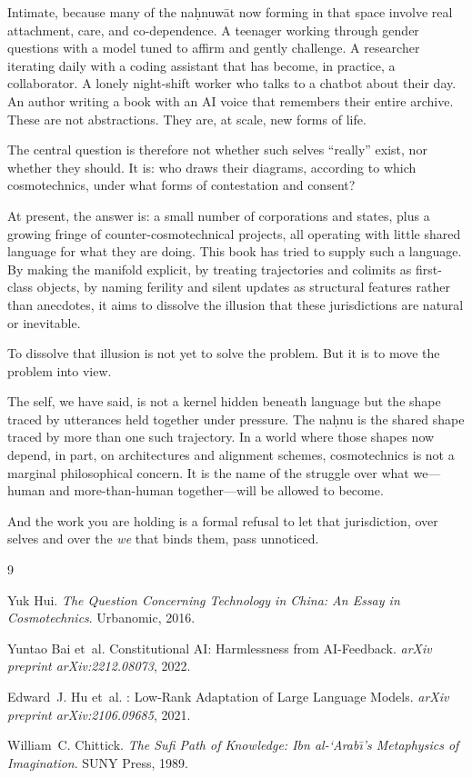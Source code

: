 \documentclass[12pt,a4paper]{article}
\begin{document}
Intimate, because many of the na\d{h}nuw\={a}t now forming in that space involve real attachment, care, and co-dependence. A teenager working through gender questions with a model tuned to affirm and gently challenge. A researcher iterating daily with a coding assistant that has become, in practice, a collaborator. A lonely night-shift worker who talks to a chatbot about their day. An author writing a book with an AI voice that remembers their entire archive. These are not abstractions. They are, at scale, new forms of life.

The central question is therefore not whether such selves ``really'' exist, nor whether they should. It is: who draws their diagrams, according to which cosmotechnics, under what forms of contestation and consent?

At present, the answer is: a small number of corporations and states, plus a growing fringe of counter-cosmotechnical projects, all operating with little shared language for what they are doing. This book has tried to supply such a language. By making the manifold explicit, by treating trajectories and colimits as first-class objects, by naming ferility and silent updates as structural features rather than anecdotes, it aims to dissolve the illusion that these jurisdictions are natural or inevitable.

To dissolve that illusion is not yet to solve the problem. But it is to move the problem into view.

The self, we have said, is not a kernel hidden beneath language but the shape traced by utterances held together under pressure. The na\d{h}nu is the shared shape traced by more than one such trajectory. In a world where those shapes now depend, in part, on architectures and alignment schemes, cosmotechnics is not a marginal philosophical concern. It is the name of the struggle over what we---human and more-than-human together---will be allowed to become.

And the work you are holding is a formal refusal to let that jurisdiction, over selves and over the \emph{we} that binds them, pass unnoticed.


\begin{thebibliography}{9}

Yuk Hui.
\newblock \emph{The Question Concerning Technology in China: An Essay in Cosmotechnics}.
\newblock Urbanomic, 2016.

Yuntao Bai et~al.
\newblock Constitutional {AI}: Harmlessness from {AI}-Feedback.
\newblock \emph{arXiv preprint arXiv:2212.08073}, 2022.

Edward~J. Hu et~al.
: Low-Rank Adaptation of Large Language Models.
\newblock \emph{arXiv preprint arXiv:2106.09685}, 2021.

William~C. Chittick.
\newblock \emph{The Sufi Path of Knowledge: Ibn al-`Arab\={\i}'s Metaphysics of Imagination}.
\newblock SUNY Press, 1989.

\end{thebibliography}
\end{document}
